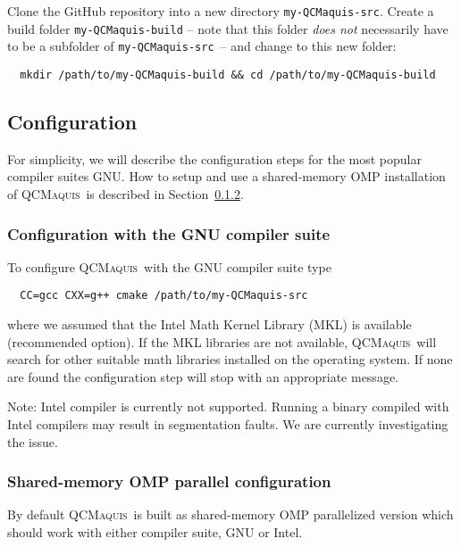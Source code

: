 \documentclass[bibliography=totoc,12pt,a4paper]{scrartcl}
\newcommand{\qcm}{\textsc{QCMaquis}}
\newcommand{\qcmsrc}{\texttt{my-QCMaquis-src}}
\newcommand{\qcmbuild}{\texttt{my-QCMaquis-build}}
\begin{document}
Clone the GitHub repository into a new directory \texttt{\qcmsrc}.
Create a build folder \texttt{\qcmbuild} -- note that this folder \emph{does not} necessarily have to be a subfolder of \qcmsrc\ -- and change to this new folder:

\begin{verbatim}
  mkdir /path/to/my-QCMaquis-build && cd /path/to/my-QCMaquis-build
\end{verbatim}

\subsection{Configuration}
\label{subsec:configure-stand}

For simplicity, we will describe the configuration steps for the most popular compiler suites GNU.
How to setup and use a shared-memory OMP installation of \qcm\ is described in Section~\ref{subsubsec:parallel-stand}.

\subsubsection{Configuration with the GNU compiler suite}
\label{subsubsec:gnu-conf-stand}

\noindent To configure \qcm\ with the GNU compiler suite type

\begin{verbatim}
  CC=gcc CXX=g++ cmake /path/to/my-QCMaquis-src
\end{verbatim}
%
where we assumed that the Intel Math Kernel Library (MKL) is available (recommended option).
If the MKL libraries are not available, \qcm\ will search for other suitable math libraries installed on the operating system. If none are found the configuration step will stop with an appropriate message.

\begin{framed}
  \noindent Note: Intel compiler is currently not supported. Running a binary compiled with Intel compilers may result in segmentation faults. We are currently investigating the issue.
\end{framed}

\subsubsection{Shared-memory OMP parallel configuration}
\label{subsubsec:parallel-stand}

By default \qcm\ is built as shared-memory OMP parallelized version which should work with either compiler suite, GNU or Intel.
\end{document}
